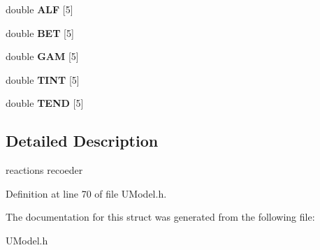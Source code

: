 \begin{DoxyCompactItemize}
\mbox{\label{structUModel_1_1__REAC_a19447fc8849380e2ef254bd99be350b9}} 
double {\bfseries A\+LF} \mbox{[}5\mbox{]}
\item 
\mbox{\label{structUModel_1_1__REAC_a2a7e2012eaee7c7b57b6169d75ed0561}} 
double {\bfseries B\+ET} \mbox{[}5\mbox{]}
\item 
\mbox{\label{structUModel_1_1__REAC_a2a82372b421f066b7750d8f922efd768}} 
double {\bfseries G\+AM} \mbox{[}5\mbox{]}
\item 
\mbox{\label{structUModel_1_1__REAC_ada68e9e548d07943b637c4a3f0884438}} 
double {\bfseries T\+I\+NT} \mbox{[}5\mbox{]}
\item 
\mbox{\label{structUModel_1_1__REAC_ac2993bd9620aeb8dbb01be2865edba28}} 
double {\bfseries T\+E\+ND} \mbox{[}5\mbox{]}
\end{DoxyCompactItemize}


\subsection{Detailed Description}
reactions recoeder 

Definition at line 70 of file U\+Model.\+h.



The documentation for this struct was generated from the following file\+:\begin{DoxyCompactItemize}
\item 
U\+Model.\+h\end{DoxyCompactItemize}
